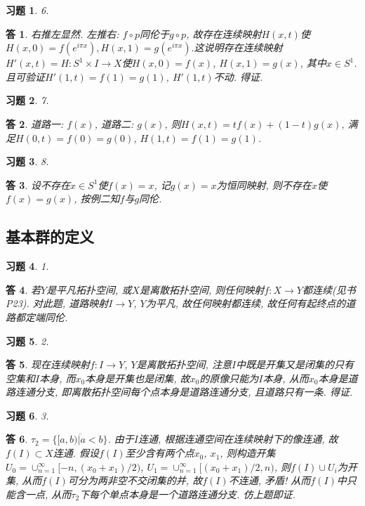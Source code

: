\documentclass{ctexart}%
\newtheorem*{exercise}{习题}
\newtheorem*{solution}{答}
\theoremstyle{definition}
\theoremstyle{remark}
\begin{document}
\begin{exercise}6.
\end{exercise}
\begin{solution}右推左显然. 左推右: $f\circ p$同伦于$g\circ p$, 故存在连续映射$H(x,t)$使$H(x,0)=f(e^{i \pi x}), H(x,1)=g(e^{i \pi x}).$这说明存在连续映射$H'(x,t)=H:S^1\times I\rightarrow X$使$H(x,0)=f(x)$, $H(x,1)=g(x)$, 其中$x\in S^1$. 且可验证$H'(1,t)=f(1)=g(1)$, $H'(1,t)$不动. 得证.
\end{solution}

\begin{exercise}7.
\end{exercise}
\begin{solution}
道路一: $f(x)$, 道路二: $g(x)$, 则$H(x,t)=tf(x)+(1-t)g(x)$, 满足$H(0,t)=f(0)=g(0)$, $H(1,t)=f(1)=g(1)$.
\end{solution}

\begin{exercise}8.
\end{exercise}
\begin{solution}
设不存在$x\in S^1$使$f(x)=x$, 记$g(x)=x$为恒同映射, 则不存在$x$使$f(x)=g(x)$, 按例二知$f$与$g$同伦. 
\end{solution}

\subsection{基本群的定义}

\begin{exercise}1.
\end{exercise}
\begin{solution}
若$Y$是平凡拓扑空间, 或$X$是离散拓扑空间, 则任何映射$f:X\rightarrow Y$都连续(见书P23). 对此题, 道路映射$I\rightarrow Y$, $Y$为平凡, 故任何映射都连续, 故任何有起终点的道路都定端同伦.
\end{solution}
\begin{exercise}2.
\end{exercise}
\begin{solution}
现在连续映射$f:I\rightarrow Y$, $Y$是离散拓扑空间, 注意$I$中既是开集又是闭集的只有空集和$I$本身, 而$x_0$本身是开集也是闭集, 故$x_0$的原像只能为$I$本身, 从而$x_0$本身是道路连通分支, 即离散拓扑空间每个点本身是道路连通分支, 且道路只有一条. 得证. 
\end{solution}

\begin{exercise}3.
\end{exercise}
\begin{solution}
$\tau_2=\overline{\{[a,b)|a<b\}}$. 由于$I$连通, 根据连通空间在连续映射下的像连通, 故$f(I)\subset X$连通. 假设$f(I)$至少含有两个点$x_0$, $x_1$, 则构造开集$U_0=\cup_{n=1}^\infty[-n,(x_0+x_1)/2)$, $U_1=\cup_{n=1}^\infty[(x_0+x_1)/2,n)$, 则$f(I)\cup U_i$为开集, 从而$f(I)$可分为两非空不交闭集的并, 故$f(I)$不连通, 矛盾! 从而$f(I)$中只能含一点, 从而$\tau_2$下每个单点本身是一个道路连通分支. 仿上题即证.
\end{solution}
\end{document}
